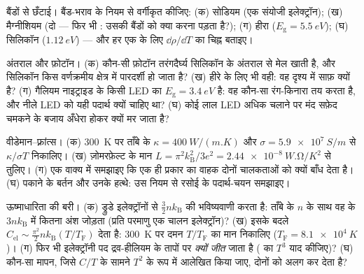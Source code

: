 \begin{exercise}[$\star$]\label{exo:b3:electrons-in-solids:3}
बैंडों से छँटाई। बैंड-भराव के नियम से वर्गीकृत कीजिए: (क)
सोडियम (एक संयोजी इलेक्ट्रॉन); (ख) मैग्नीशियम (दो --- फिर भी
: उसकी बैंडों को क्या करना पड़ता है?); (ग) हीरा
($E_{\text{g}} = \qty{5.5}{eV}$); (घ) सिलिकॉन
($\qty{1.12}{eV}$) --- और हर एक के लिए
$\dd\rho/\dd T$ का चिह्न बताइए।
\end{exercise}

\begin{exercise}[$\star$]\label{exo:b3:electrons-in-solids:4}
अंतराल और फ़ोटॉन। (क) कौन-सी फ़ोटॉन तरंगदैर्घ्य सिलिकॉन के अंतराल से
मेल खाती है, और सिलिकॉन किस वर्णक्रमीय क्षेत्र में पारदर्शी हो जाता
है? (ख) हीरे के लिए भी वही: वह दृश्य में साफ़ क्यों है? (ग) गैलियम
नाइट्राइड के किसी LED का $E_{\text{g}} =
\qty{3.4}{eV}$ है: वह कौन-सा रंग-किनारा तय करता है, और नीले
LED को यही पदार्थ क्यों चाहिए था? (घ) कोई लाल LED अधिक चलाने पर
मंद सफ़ेद चमकने के बजाय अँधेरा होकर क्यों मर जाता है?
\end{exercise}

\begin{exercise}[$\star\star$]\label{exo:b3:electrons-in-solids:5}
वीडेमान--फ़्रांत्स। (क) \qty{300}{K} पर ताँबे के $\kappa =
\qty{400}{W/(m.K)}$ और $\sigma = \qty{5.9e7}{S/m}$ से
$\kappa/\sigma T$ निकालिए। (ख) ज़ोमरफ़ेल्ट के मान
$L = \pi^2k_{\text{B}}^2/3e^2 =
\qty{2.44e-8}{W.\ohm/K^2}$ से तुलिए। (ग) एक वाक्य में समझाइए कि
एक ही प्रकार का वाहक दोनों चालकताओं को क्यों बाँध देता है। (घ) पकाने
के बर्तन और उनके हत्थे: उस नियम से रसोई के पदार्थ-चयन समझाइए।
\end{exercise}

\begin{exercise}[$\star\star$]\label{exo:b3:electrons-in-solids:6}
ऊष्माधारिता की बरी। (क) ड्रुडे इलेक्ट्रॉनों से
$\tfrac32nk_{\text{B}}$ की भविष्यवाणी करता है: ताँबे के $n$ के साथ
वह  के $3nk_{\text{B}}$ में कितना अंश जोड़ता
(प्रति परमाणु एक चालन इलेक्ट्रॉन)? (ख)
 इसके बदले $C_{\text{el}}
\sim \tfrac{\pi^2}{2}nk_{\text{B}}(T/T_{\text{F}})$ देता है:
\qty{300}{K} पर दमन $T/T_{\text{F}}$ का मान निकालिए
($T_{\text{F}} = \qty{8.1e4}{K}$)। (ग) फिर भी इलेक्ट्रॉनी पद
द्रव-हीलियम के तापों पर \emph{क्यों जीत} जाता है
( का $T^3$ याद कीजिए)? (घ) कौन-सा मापन, जिसे
$C/T$ के सामने $T^2$ के रूप में आलेखित किया जाए, दोनों को अलग कर देता है?
\end{exercise}

